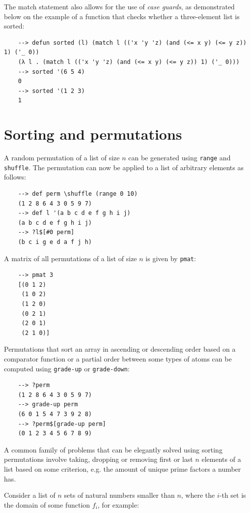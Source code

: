 The match statement also allows for the use of \textit{case guards}, as demonstrated below on the example of a function that checks whether a three-element list is sorted:

\begin{Verbatim}
    --> defun sorted (l) (match l (('x 'y 'z) (and (<= x y) (<= y z)) 1) ('_ 0))
    (λ l . (match l (('x 'y 'z) (and (<= x y) (<= y z)) 1) ('_ 0)))
    --> sorted '(6 5 4)
    0
    --> sorted '(1 2 3)
    1
\end{Verbatim}

\section{Sorting and permutations}

A random permutation of a list of size $n$ can be generated using \verb|range| and \verb|shuffle|. The permutation can now be applied to a list of arbitrary elements as follows:

\begin{Verbatim}
    --> def perm \shuffle (range 0 10)
    (1 2 8 6 4 3 0 5 9 7)
    --> def l '(a b c d e f g h i j)
    (a b c d e f g h i j)
    --> ?l$[#0 perm]
    (b c i g e d a f j h)
\end{Verbatim}

A matrix of all permutations of a list of size $n$ is given by \verb|pmat|:

\begin{Verbatim}
    --> pmat 3
    [(0 1 2)
     (1 0 2)
     (1 2 0)
     (0 2 1)
     (2 0 1)
     (2 1 0)]
\end{Verbatim}

Permutations that sort an array in ascending or descending order based on a comparator function or a partial order between some types of atoms can be computed using \verb|grade-up| or \verb|grade-down|:

\begin{Verbatim}
    --> ?perm
    (1 2 8 6 4 3 0 5 9 7)
    --> grade-up perm
    (6 0 1 5 4 7 3 9 2 8)
    --> ?perm$[grade-up perm]
    (0 1 2 3 4 5 6 7 8 9)
\end{Verbatim}

A common family of problems that can be elegantly solved using sorting permutations involve taking, dropping or removing first or last $n$ elements of a list based on some criterion, e.g. the amount of unique prime factors a number has.

Consider a list of $n$ sets of natural numbers smaller than $n$, where the $i$-th set is the domain of some function $f_i$, for example:


